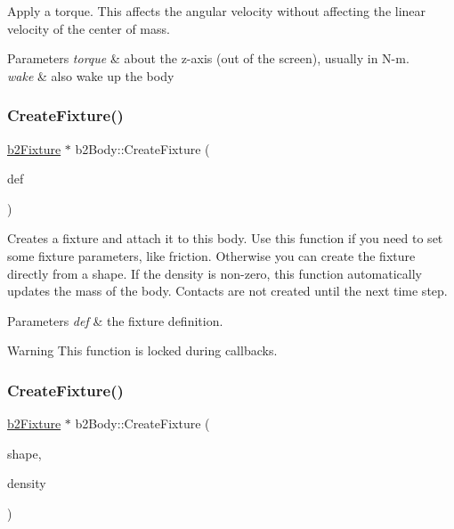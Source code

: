 Apply a torque. This affects the angular velocity without affecting the linear velocity of the center of mass. 
\begin{DoxyParams}{Parameters}
{\em torque} & about the z-\/axis (out of the screen), usually in N-\/m. \\
\hline
{\em wake} & also wake up the body \\
\hline
\end{DoxyParams}
\mbox{\label{classb2_body_aa4892301e9b9d62ede5e93dad1743894}} 
\subsubsection{\texorpdfstring{CreateFixture()}{CreateFixture()}\hspace{0.1cm}{\footnotesize\ttfamily [1/2]}}
{\footnotesize\ttfamily \mbox{\hyperlink{classb2_fixture}{b2\+Fixture}} $\ast$ b2\+Body\+::\+Create\+Fixture (\begin{DoxyParamCaption}\item[{const \mbox{\hyperlink{structb2_fixture_def}{b2\+Fixture\+Def}} $\ast$}]{def }\end{DoxyParamCaption})}

Creates a fixture and attach it to this body. Use this function if you need to set some fixture parameters, like friction. Otherwise you can create the fixture directly from a shape. If the density is non-\/zero, this function automatically updates the mass of the body. Contacts are not created until the next time step. 
\begin{DoxyParams}{Parameters}
{\em def} & the fixture definition. \\
\hline
\end{DoxyParams}
\begin{DoxyWarning}{Warning}
This function is locked during callbacks. 
\end{DoxyWarning}
\mbox{\label{classb2_body_a52d971867086d5db79769a62bbb70a60}} 
\subsubsection{\texorpdfstring{CreateFixture()}{CreateFixture()}\hspace{0.1cm}{\footnotesize\ttfamily [2/2]}}
{\footnotesize\ttfamily \mbox{\hyperlink{classb2_fixture}{b2\+Fixture}} $\ast$ b2\+Body\+::\+Create\+Fixture (\begin{DoxyParamCaption}\item[{const \mbox{\hyperlink{classb2_shape}{b2\+Shape}} $\ast$}]{shape,  }\item[{\mbox{\hyperlink{b2_settings_8h_aacdc525d6f7bddb3ae95d5c311bd06a1}{float32}}}]{density }\end{DoxyParamCaption})}


